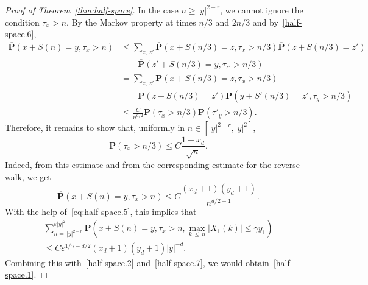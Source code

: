 \documentclass[AHL,Unicode,longabstracts,published]{cedram}
\newcommand{\pr}{\mathbf{P}}
\renewcommand{\le}{\leqslant}
\renewcommand{\ge}{\geqslant}
\begin{document}
\begin{proof}[Proof of Theorem~\ref{thm:half-space}]
In the case $n\ge| y|^{2-r}$, we cannot ignore the condition $\tau_x>n$. By the Markov property at times $n/3$ and $2n/3$ and by~\eqref{half-space.6},
\begin{align*}
\overline{\pr}\left(x+S(n)=y,\tau_x>n\right)
&\le\sum_{z,\,z'}\overline{\pr}\left(x+S(n/3)=z,\tau_x>n/3\right)\overline{\pr}\left(z+S(n/3)=z'\right)\\
&\qquad\overline{\pr}\left(z'+S(n/3)=y,\tau_{z'}>n/3\right)\\
&=\sum_{z,\,z'}\overline{\pr}\left(x+S(n/3)=z,\tau_x>n/3\right)\\
&\qquad\overline{\pr}\left(z+S(n/3)=z'\right)
\overline{\pr}\left(y+S'(n/3)=z',\tau_{y}>n/3\right)\\
&\le\frac{C}{n^{d/2}}
\overline{\pr}\left(\tau_x>n/3\right)\overline{\pr}\left(\tau'_y>n/3\right).
\end{align*}
Therefore, it remains to show that, uniformly in $n\in[|y|^{2-r},|y|^2]$,
\begin{equation}\label{half-space.8}
\overline{\pr}\left(\tau_x>n/3\right)\le C\frac{1+x_d}{\sqrt{n}}.
\end{equation}
Indeed, from this estimate and from the corresponding estimate for the reverse walk, we get
\[
\overline{\pr}\left(x+S(n)=y,\tau_x>n\right)\le C\frac{(x_d+1)(y_d+1)}{n^{d/2+1}}.
\]
With the help of~\eqref{eq:half-space.5}, this implies that
\begin{multline}\label{eq:new.est.4}
\sum_{n=\,|y|^{2-r}}^{\varepsilon|y|^2}
\pr\left(x+S(n)=y,\tau_x>n,\max_{k\,\le\,n}\left|X_1(k)\right|\le\gamma y_1\right)\\
\le C\varepsilon^{1/\gamma-d/2}(x_d+1)(y_d+1)|y|^{-d}.
\end{multline}
Combining this with~\eqref{half-space.2} and~\eqref{half-space.7}, we would obtain~\eqref{half-space.1}.


\end{proof}
\end{document}
